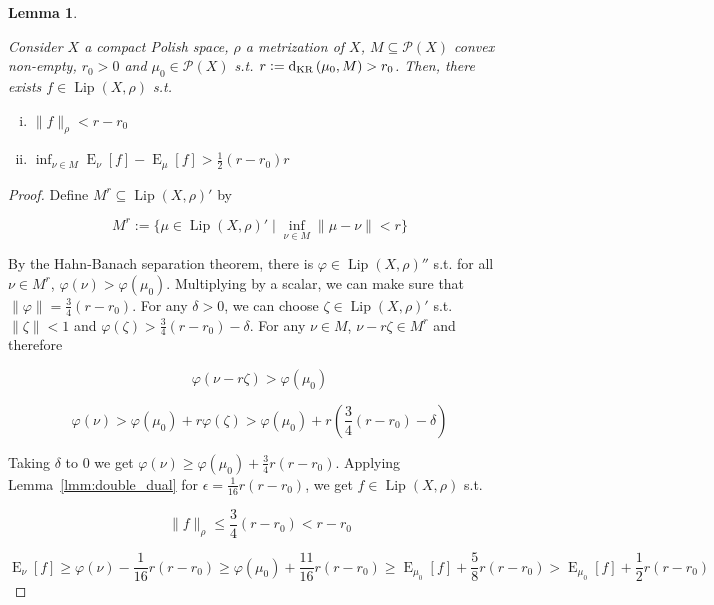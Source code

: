\documentclass[aop,preprint]{imsart}
\numberwithin{equation}{section}
\theoremstyle{definition}
\theoremstyle{plain}
\newtheorem{lemma}{Lemma}[section]
\newcommand{\N}[1]{\lVert #1 \rVert}
\DeclareMathOperator{\E}{E}
\newcommand{\PM}{\mathcal{P}}
\newcommand{\Lp}{{\operatorname{Lip}}}
\newcommand{\DKR}{\operatorname{d}_{\textnormal{KR}}}
\begin{document}
\begin{samepage}
\begin{lemma}
\label{lmm:separation}

Consider $X$ a compact Polish space, $\rho$ a metrization of $X$, $M \subseteq \PM\left(X\right)$ convex non-empty, $r_0 > 0$ and $\mu_0 \in \PM\left(X\right)$ s.t. $r:=\DKR\left(\mu_0,M\right) > r_0$. Then, there exists $f \in \Lp\left(X,\rho\right)$ s.t.

\begin{enumerate}[i.]

\item $\N{f}_\rho < r - r_0$
\item $\inf_{\nu \in M} \E_\nu\left[f\right] - \E_\mu\left[f\right] > \frac{1}{2}\left(r-r_0\right)r$

\end{enumerate}

\end{lemma}
\end{samepage}

\begin{proof}

Define $M^r \subseteq \Lp\left(X,\rho\right)'$ by

$$M^r:=\{\mu \in \Lp\left(X,\rho\right)' \mid \inf_{\nu \in M} \N{\mu - \nu} < r\}$$

By the Hahn-Banach separation theorem, there is $\varphi \in \Lp\left(X,\rho\right)''$ s.t. for all $\nu \in M^r$, $\varphi\left(\nu\right) > \varphi\left(\mu_0\right)$. Multiplying by a scalar, we can make sure that $\N{\varphi} = \frac{3}{4}\left(r - r_0\right)$. For any $\delta > 0$, we can choose $\zeta \in \Lp\left(X,\rho\right)'$ s.t. $\N{\zeta} < 1$ and $\varphi\left(\zeta\right) > \frac{3}{4}\left(r-r_0\right) - \delta$.  For any $\nu \in M$, $\nu - r \zeta \in M^r$ and therefore

$$\varphi\left(\nu - r \zeta\right) > \varphi\left(\mu_0\right)$$

$$\varphi\left(\nu\right) > \varphi\left(\mu_0\right) + r \varphi\left(\zeta\right) > \varphi\left(\mu_0\right) + r \left(\frac{3}{4}\left(r-r_0\right) - \delta\right)$$

Taking $\delta$ to 0 we get $\varphi\left(\nu\right) \geq \varphi\left(\mu_0\right) + \frac{3}{4} r \left(r - r_0\right)$. Applying Lemma~\ref{lmm:double_dual} for $\epsilon = \frac{1}{16} r \left(r - r_0\right)$, we get $f \in \Lp\left(X,\rho\right)$ s.t.

$$\N{f}_\rho \leq \frac{3}{4} \left(r - r_0\right) < r - r_0$$ 

$$\E_\nu\left[f\right] \geq \varphi\left(\nu\right) - \frac{1}{16} r \left(r - r_0\right) \geq \varphi\left(\mu_0\right) + \frac{11}{16} r \left(r - r_0\right) \geq \E_{\mu_0}\left[f\right] +  \frac{5}{8} r \left(r - r_0\right) > \E_{\mu_0}\left[f\right] +  \frac{1}{2} r \left(r - r_0\right)$$
\end{proof}
\end{document}

